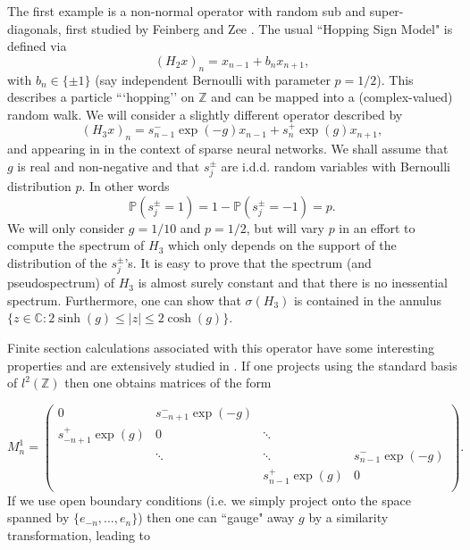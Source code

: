 \documentclass[a4paper,10pt]{article}
\begin{document}
\begin{example}

The first example is a non-normal operator with random sub and super-diagonals, first studied by Feinberg and Zee \cite{feinberg1999non,holz2003remarkable,chandler2010eigenvalue}. The usual ``Hopping Sign Model" is defined via
\begin{equation*}
(H_2x)_n=x_{n-1}+b_{n}x_{n+1},
\end{equation*}
with $b_n\in\{\pm 1\}$ (say independent Bernoulli with parameter $p=1/2$). This describes a particle ```hopping'' on $\mathbb{Z}$ and can be mapped into a (complex-valued) random walk. We will consider a slightly different operator described by
\begin{equation}
(H_3x)_n=s_{n-1}^{-}\exp({-g})x_{n-1}+s_{n}^{+}\exp({g})x_{n+1},
\end{equation}
and appearing in \cite{amir2016non} in the context of sparse neural networks. We shall assume that $g$ is real and non-negative and that $s_j^{\pm}$ are i.d.d. random variables with Bernoulli distribution $p$. In other words 
$$\mathbb{P}(s_j^{\pm}=1)=1-\mathbb{P}(s_j^{\pm}=-1)=p.$$
We will only consider $g=1/10$ and $p=1/2$, but will vary $p$ in an effort to compute the spectrum of $H_3$ which only depends on the support of the distribution of the $s^{\pm{}}_j$'s. It is easy to prove that the spectrum (and pseudospectrum) of $H_3$ is almost surely constant and that there is no inessential spectrum. Furthermore, one can show that $\sigma(H_3)$ is contained in the annulus $\{z\in\mathbb{C}:2\sinh(g)\leq\left|z\right|\leq2\cosh(g)\}$.

Finite section calculations associated with this operator have some interesting properties and are extensively studied in \cite{amir2016non}. If one projects using the standard basis of $l^2(\mathbb{Z})$ then one obtains matrices of the form

\begin{equation*}
M_n^1 =
\left(
\begin{matrix}
0    &s_{-n+1}^{-}\exp({-g})&  &   \\
s_{-n+1}^{+}\exp({g})& 0 & \ddots &\\
    & \ddots & \ddots & s_{n-1}^{-}\exp({-g}) \\
    &  & s_{n-1}^{+}\exp({g}) & 0  \\

\end{matrix}
\right).
\end{equation*}
If we use open boundary conditions (i.e. we simply project onto the space spanned by $\{e_{-n},...,e_n\}$) then one can ``gauge" away $g$ by a similarity transformation, leading to


\end{example}
\end{document}
